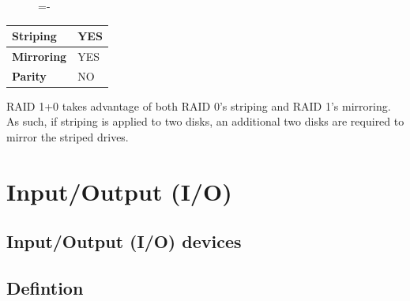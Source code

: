\documentclass[a4paper]{systems-software}
\begin{document}
\begin{figure}[H]
  \lineskip=-\fboxrule
\end{figure}

\begin{longtabu} to \textwidth {| X[1,l] | X[6,l] |}
    \hline
    \textbf{Striping} & YES
	\\ \hline
	\textbf{Mirroring} & YES
	\\ \hline
	\textbf{Parity} & NO
	\\ \hline
\end{longtabu}

RAID 1+0 takes advantage of both RAID 0's striping and RAID 1's mirroring. As such, if striping is applied to two disks, an additional two disks are required to mirror the striped drives.


\chapter{Input/Output (I/O)}

\section{Input/Output (I/O) devices}

\section*{Defintion}
\end{document}
